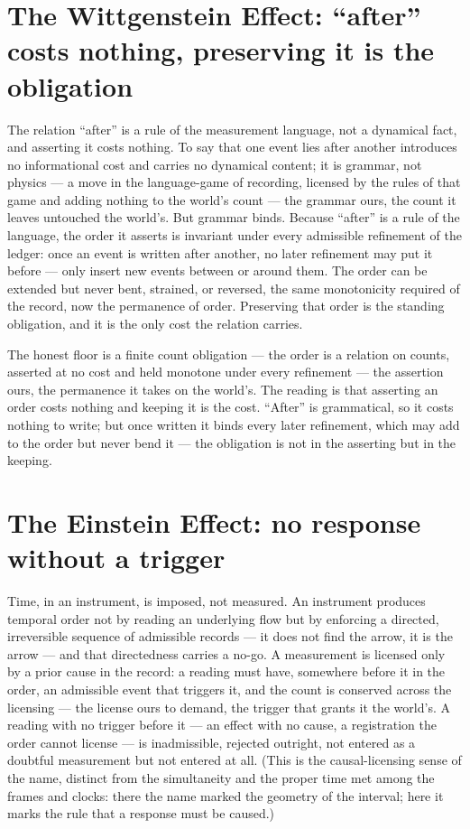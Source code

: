\section{The Wittgenstein Effect: ``after'' costs nothing, preserving it is the obligation}
\label{se:wittgenstein}

The relation ``after'' is a rule of the measurement language, not a dynamical fact, and asserting it costs
nothing. To say that one event lies after another introduces no informational cost and carries no dynamical
content; it is grammar, not physics --- a move in the language-game of recording, licensed by the rules of that
game and adding nothing to the world's count --- the grammar ours, the count it leaves untouched the world's.
But grammar binds. Because ``after'' is a rule of the language,
the order it asserts is invariant under every admissible refinement of the ledger: once an event is written
after another, no later refinement may put it before --- only insert new events between or around them. The
order can be extended but never bent, strained, or reversed, the same monotonicity required of
the record, now the permanence of order. Preserving that order is the standing obligation, and it is
the only cost the relation carries.

The honest floor is a finite count obligation --- the order is a relation on counts, asserted at no cost and
held monotone under every refinement --- the assertion ours, the permanence it takes on the world's. The
reading is that asserting an order costs nothing and keeping it is the cost.
``After'' is grammatical, so it costs nothing to write; but once written it binds every later refinement, which
may add to the order but never bend it --- the obligation is not in the asserting but in the keeping.

\section{The Einstein Effect: no response without a trigger}
\label{se:einstein-causal}

Time, in an instrument, is imposed, not measured. An instrument produces temporal order not by reading an
underlying flow but by enforcing a directed, irreversible sequence of admissible records --- it does not find
the arrow, it is the arrow --- and that directedness carries a no-go. A measurement is licensed only by a prior
cause in the record: a reading must have, somewhere before it in the order, an admissible event that triggers
it, and the count is conserved across the licensing --- the license ours to demand, the trigger that grants it
the world's. A reading with no trigger before it --- an effect with no
cause, a registration the order cannot license --- is inadmissible, rejected outright, not entered as a
doubtful measurement but not entered at all. (This is the causal-licensing sense of the name, distinct from
the simultaneity and the proper time met among the frames and clocks: there the name marked the geometry of
the interval; here it marks the rule that a response must be caused.)

